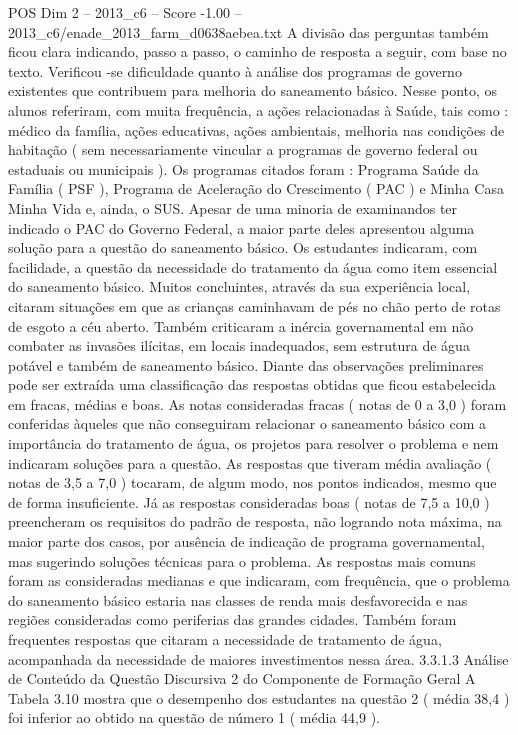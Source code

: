 \begin{textsample}{POS Dim 2 – 2013\_c6 – Score -1.00 – 2013\_c6/enade\_2013\_farm\_d0638aebea.txt}
A divisão das perguntas também ficou clara indicando, passo a passo, o caminho de resposta a seguir, com base no texto.
Verificou -se dificuldade quanto à análise dos programas de governo existentes que contribuem para melhoria do saneamento básico.
Nesse ponto, os alunos referiram, com muita frequência, a ações relacionadas à Saúde, tais como : médico da família, ações educativas, ações ambientais, melhoria nas condições de habitação ( sem necessariamente vincular a programas de governo federal ou estaduais ou municipais ).
Os programas citados foram : Programa Saúde da Família ( PSF ), Programa de Aceleração do Crescimento ( PAC ) e Minha Casa Minha Vida e, ainda, o SUS.
Apesar de uma minoria de examinandos ter indicado o PAC do Governo Federal, a maior parte deles apresentou alguma solução para a questão do saneamento básico.
Os estudantes indicaram, com facilidade, a questão da necessidade do tratamento da água como item essencial do saneamento básico.
Muitos concluintes, através da sua experiência local, citaram situações em que as crianças caminhavam de pés no chão perto de rotas de esgoto a céu aberto.
Também criticaram a inércia governamental em não combater as invasões ilícitas, em locais inadequados, sem estrutura de água potável e também de saneamento básico.
Diante das observações preliminares pode ser extraída uma classificação das respostas obtidas que ficou estabelecida em fracas, médias e boas.
As notas consideradas fracas ( notas de 0 a 3,0 ) foram conferidas àqueles que não conseguiram relacionar o saneamento básico com a importância do tratamento de água, os projetos para resolver o problema e nem indicaram soluções para a questão.
As respostas que tiveram média avaliação ( notas de 3,5 a 7,0 ) tocaram, de algum modo, nos pontos indicados, mesmo que de forma insuficiente.
Já as respostas consideradas boas ( notas de 7,5 a 10,0 ) preencheram os requisitos do padrão de resposta, não logrando nota máxima, na maior parte dos casos, por ausência de indicação de programa governamental, mas sugerindo soluções técnicas para o problema.
As respostas mais comuns foram as consideradas medianas e que indicaram, com frequência, que o problema do saneamento básico estaria nas classes de renda mais desfavorecida e nas regiões consideradas como periferias das grandes cidades.
Também foram frequentes respostas que citaram a necessidade de tratamento de água, acompanhada da necessidade de maiores investimentos nessa área. 3.3.1.3 Análise de Conteúdo da Questão Discursiva 2 do Componente de Formação Geral A Tabela 3.10 mostra que o desempenho dos estudantes na questão 2 ( média 38,4 ) foi inferior ao obtido na questão de número 1 ( média 44,9 ).

\end{textsample}
